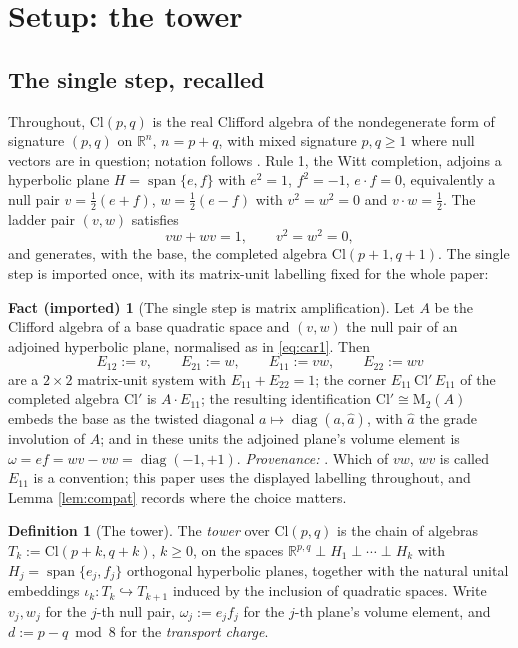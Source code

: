 \documentclass[11pt]{article}
\theoremstyle{definition}
\newtheorem{definition}[theorem]{Definition}
\newtheorem{fact}[theorem]{Fact (imported)}
\newcommand{\Cl}{\mathrm{Cl}}
\newcommand{\R}{\mathbb{R}}
\newcommand{\Mat}{\mathrm{M}}
\begin{document}
\section{Setup: the tower}\label{sec:setup}

\subsection{The single step, recalled}\label{subsec:step}

Throughout, $\Cl(p,q)$ is the real Clifford algebra of the nondegenerate form of signature $(p,q)$ on $\R^n$, $n = p + q$, with mixed signature $p, q \geq 1$ where null vectors are in question; notation follows \cite{ButlerT1}. Rule 1, the Witt completion, adjoins a hyperbolic plane $H = \operatorname{span}\{e, f\}$ with $e^2 = 1$, $f^2 = -1$, $e \cdot f = 0$, equivalently a null pair $v = \tfrac12(e+f)$, $w = \tfrac12(e-f)$ with $v^2 = w^2 = 0$ and $v \cdot w = \tfrac12$. The ladder pair $(v, w)$ satisfies
\begin{equation}\label{eq:car1}
vw + wv = 1, \qquad v^2 = w^2 = 0,
\end{equation}
and generates, with the base, the completed algebra $\Cl(p{+}1, q{+}1)$. The single step is imported once, with its matrix-unit labelling fixed for the whole paper:

\begin{fact}[The single step is matrix amplification]\label{fact:step}
Let $A$ be the Clifford algebra of a base quadratic space and $(v, w)$ the null pair of an adjoined hyperbolic plane, normalised as in \eqref{eq:car1}. Then
\[
E_{12} := v, \qquad E_{21} := w, \qquad E_{11} := vw, \qquad E_{22} := wv
\]
are a $2 \times 2$ matrix-unit system with $E_{11} + E_{22} = 1$; the corner $E_{11}\, \Cl'\, E_{11}$ of the completed algebra $\Cl'$ is $A \cdot E_{11}$; the resulting identification $\Cl' \cong \Mat_2(A)$ embeds the base as the twisted diagonal $a \mapsto \operatorname{diag}(a, \hat a)$, with $\hat a$ the grade involution of $A$; and in these units the adjoined plane's volume element is $\omega = ef = wv - vw = \operatorname{diag}(-1, +1)$. \emph{Provenance:} \cite[Thm.~7.1]{ButlerT1}. Which of $vw$, $wv$ is called $E_{11}$ is a convention; this paper uses the displayed labelling throughout, and Lemma \ref{lem:compat} records where the choice matters.
\end{fact}

\begin{definition}[The tower]\label{def:tower}
The \emph{tower} over $\Cl(p,q)$ is the chain of algebras $T_k := \Cl(p{+}k, q{+}k)$, $k \geq 0$, on the spaces $\R^{p,q} \perp H_1 \perp \cdots \perp H_k$ with $H_j = \operatorname{span}\{e_j, f_j\}$ orthogonal hyperbolic planes, together with the natural unital embeddings $\iota_k : T_k \hookrightarrow T_{k+1}$ induced by the inclusion of quadratic spaces. Write $v_j, w_j$ for the $j$-th null pair, $\omega_j := e_j f_j$ for the $j$-th plane's volume element, and $d := p - q \bmod 8$ for the \emph{transport charge}.
\end{definition}
\end{document}
